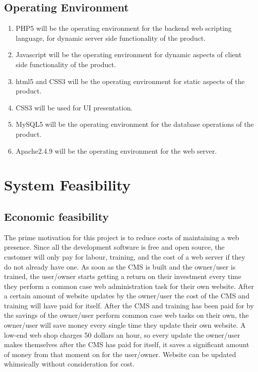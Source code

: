 \documentclass[11pt]{article}
\begin{document}
\subsection{Operating Environment}

\begin{enumerate}
  \item PHP5 will be the operating environment for the backend web scripting language, for dynamic server side functionality of the product.
  \item Javascript will be the operating environment for dynamic aspects of client side functionality of the product.
  \item html5 and CSS3 will be the operating environment for static aspects of the product.
  \item CSS3 will be used for UI presentation.
  \item MySQL5 will be the operating environment for the database operations of the product.
  \item Apache2.4.9 will be the operating environment for the web server.
\end{enumerate}

\section{System Feasibility }

\subsection{Economic feasibility}
The prime motivation for this project is to reduce costs of maintaining a web presence. Since all the development software is free and open source, the customer will only pay for labour, training, and the cost of a web server if they do not already have one. As soon as the CMS is built and the owner/user is trained, the user/owner starts getting a return on their investment every time they perform a common case web administration task for their own website. After a certain amount of website updates by the owner/user the cost of the CMS and training will have paid for itself. After the CMS and training has been paid for by the savings of the owner/user perform common case web tasks on their own, the owner/user will save money every single time they update their own website. A low-end web shop charges 50 dollars an hour, so every update the owner/user makes themselves after the CMS has paid for itself, it saves a significant amount of money from that moment on for the user/owner.  Website can be updated whimsically without consideration for cost.
\end{document}
